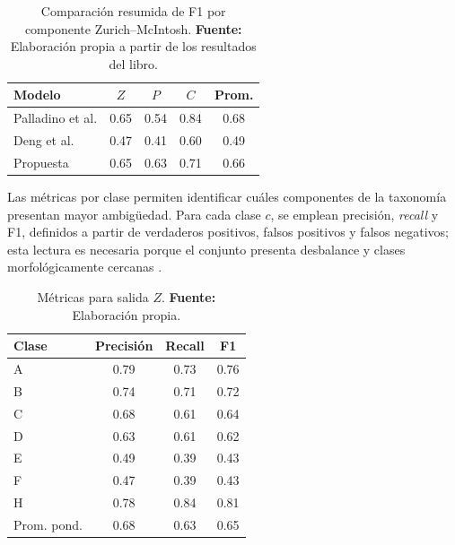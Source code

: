 \begin{table}[H]
\centering
\caption{Comparación resumida de F1 por componente Zurich--McIntosh. \textbf{Fuente:} Elaboración propia a partir de los resultados del libro.}
\label{tab:resumen-f1}
\begin{tabular}{lcccc}
\toprule
\textbf{Modelo} & \textbf{$Z$} & \textbf{$P$} & \textbf{$C$} & \textbf{Prom.} \\
\midrule
Palladino et al. & 0.65 & 0.54 & 0.84 & 0.68 \\
Deng et al. & 0.47 & 0.41 & 0.60 & 0.49 \\
Propuesta & 0.65 & 0.63 & 0.71 & 0.66 \\
\bottomrule
\end{tabular}
\end{table}

Las métricas por clase permiten identificar cuáles componentes de la taxonomía presentan mayor ambigüedad. Para cada clase $c$, se emplean precisión, \textit{recall} y F1, definidos a partir de verdaderos positivos, falsos positivos y falsos negativos; esta lectura es necesaria porque el conjunto presenta desbalance y clases morfológicamente cercanas \citep{mcintosh1990classification,cui2019classbalanced,sayez2023sunscc}.

\begin{table}[H]
\centering
\caption{Métricas para salida $Z$. \textbf{Fuente:} Elaboración propia.}
\label{tab:resumen-metricas-z}
\begin{tabular}{lccc}
\toprule
\textbf{Clase} & \textbf{Precisión} & \textbf{Recall} & \textbf{F1} \\
\midrule
A & 0.79 & 0.73 & 0.76 \\
B & 0.74 & 0.71 & 0.72 \\
C & 0.68 & 0.61 & 0.64 \\
D & 0.63 & 0.61 & 0.62 \\
E & 0.49 & 0.39 & 0.43 \\
F & 0.47 & 0.39 & 0.43 \\
H & 0.78 & 0.84 & 0.81 \\
Prom. pond. & 0.68 & 0.63 & 0.65 \\
\bottomrule
\end{tabular}
\end{table}


